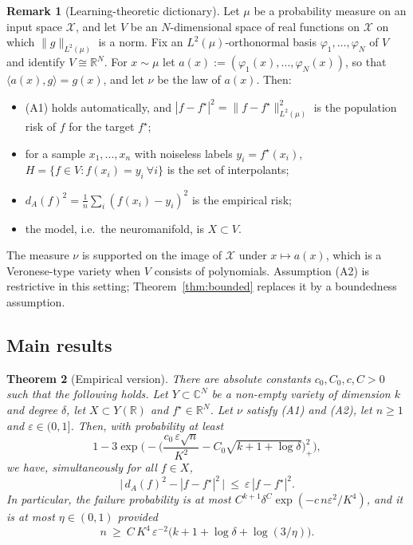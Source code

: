 \documentclass[11pt]{article}
\newtheorem{theorem}{Theorem}[section]
\theoremstyle{definition}
\newtheorem{remark}[theorem]{Remark}
\numberwithin{equation}{section}
\newcommand{\R}{\mathbb{R}}
\newcommand{\C}{\mathbb{C}}
\newcommand{\eps}{\varepsilon}
\newcommand{\fs}{f^{\star}}
\begin{document}
\begin{remark}[Learning-theoretic dictionary]\label{rem:dictionary}
Let $\mu$ be a probability measure on an input space $\mathcal X$, and let $V$ be an $N$-dimensional space of real functions on $\mathcal X$ on which $\|g\|_{L^2(\mu)}$ is a norm. Fix an $L^2(\mu)$-orthonormal basis $\varphi_1,\dots,\varphi_N$ of $V$ and identify $V\cong\R^N$. For $x\sim\mu$ let $a(x):=(\varphi_1(x),\dots,\varphi_N(x))$, so that $\langle a(x),g\rangle=g(x)$, and let $\nu$ be the law of $a(x)$. Then:
\begin{itemize}
\item (A1) holds automatically, and $|f-\fs|^2=\|f-\fs\|_{L^2(\mu)}^2$ is the population risk of $f$ for the target $\fs$;
\item for a sample $x_1,\dots,x_n$ with noiseless labels $y_i=\fs(x_i)$, $H=\{f\in V:f(x_i)=y_i\ \forall i\}$ is the set of interpolants;
\item $d_A(f)^2=\frac1n\sum_i(f(x_i)-y_i)^2$ is the empirical risk;
\item the model, i.e.\ the neuromanifold, is $X\subset V$.
\end{itemize}
The measure $\nu$ is supported on the image of $\mathcal X$ under $x\mapsto a(x)$, which is a Veronese-type variety when $V$ consists of polynomials. Assumption (A2) is restrictive in this setting; Theorem~\ref{thm:bounded} replaces it by a boundedness assumption.
\end{remark}

\subsection{Main results}

\begin{theorem}[Empirical version]\label{thm:main}
There are absolute constants $c_0,C_0,c,C>0$ such that the following holds. Let $Y\subset\C^N$ be a non-empty variety of dimension $k$ and degree $\delta$, let $X\subset Y(\R)$ and $\fs\in\R^N$. Let $\nu$ satisfy (A1) and (A2), let $n\ge1$ and $\eps\in(0,1]$. Then, with probability at least
\begin{equation}\label{eq:main-prob}
1-3\exp\!\Big(-\Big(\frac{c_0\,\eps\sqrt n}{K^2}-C_0\sqrt{k+1+\log\delta}\Big)_+^2\Big),
\end{equation}
we have, simultaneously for all $f\in X$,
\begin{equation}\label{eq:main}
\big|\,d_A(f)^2-|f-\fs|^2\,\big|\ \le\ \eps\,|f-\fs|^2 .
\end{equation}
In particular, the failure probability is at most $C^{k+1}\delta^{C}\exp(-c\,n\eps^2/K^4)$, and it is at most $\eta\in(0,1)$ provided
\begin{equation}\label{eq:main-n}
n\ \ge\ C\,K^4\,\eps^{-2}\big(k+1+\log\delta+\log(3/\eta)\big).
\end{equation}
\end{theorem}
\end{document}
